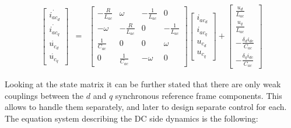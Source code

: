     \begin{equation}
        \begin{array}{rcl}
            \begin{bmatrix}
                \dot{i_{ac_d}}\\
                \dot{i_{ac_q}}\\
                \dot{u_{c_d}}\\
                \dot{u_{c_q}}
            \end{bmatrix}&=&
            \begin{bmatrix}
                -\frac{R}{L_{ac}}   &\omega &-\frac{1}{L_{ac}}  &0\\
                -\omega   &-\frac{R}{L_{ac}} &0  &-\frac{1}{L_{ac}}\\
                \frac{1}{C_{ac}}   &0 &0  &\omega\\
                0   &\frac{1}{C_{ac}} &-\omega  &0
            \end{bmatrix}
            \begin{bmatrix}
                i_{ac_d}\\
                i_{ac_q}\\
                u_{c_d}\\
                u_{c_q}
            \end{bmatrix}+
            \begin{bmatrix}
                \frac{u_d}{L_{ac}}\\
                \frac{u_q}{L_{ac}}\\
                -\frac{\delta_di_{dc}}{C_{ac}}\\
                -\frac{\delta_qi_{dc}}{C_{ac}}
            \end{bmatrix}
        \end{array}
        \label{EMPC:equ:mtx_AC}
    \end{equation}

    Looking at the state matrix it can be further stated that there are only weak couplings between the $d$ and $q$ synchronous reference frame components. This allows to handle them separately, and later to design separate control for each.
    The equation system describing the DC side dynamics is the following:

